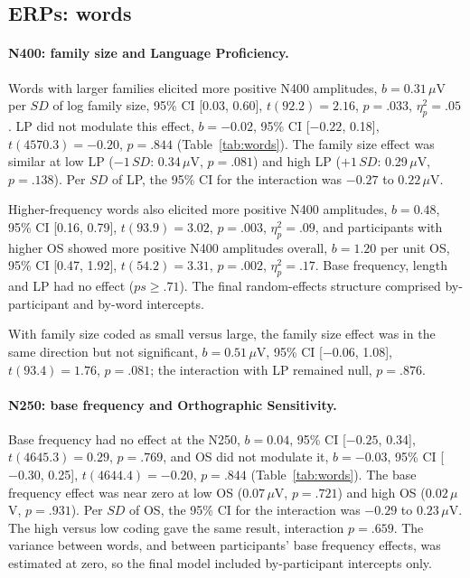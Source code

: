 \subsection{ERPs: words}

\paragraph{N400: family size and Language Proficiency.}
Words with larger families elicited more positive N400 amplitudes, $b = 0.31$\,$\mu$V
per $SD$ of log family size, 95\% CI [0.03, 0.60], $t(92.2) = 2.16$, $p = .033$,
$\eta^2_p = .05$. LP did not modulate this effect, $b = -0.02$, 95\% CI
[$-0.22$, 0.18], $t(4570.3) = -0.20$, $p = .844$ (Table~\ref{tab:words}). The
family size effect was similar at low LP ($-1\,SD$: 0.34\,$\mu$V, $p = .081$)
and high LP ($+1\,SD$: 0.29\,$\mu$V, $p = .138$). Per $SD$ of LP, the 95\% CI
for the interaction was $-0.27$ to $0.22$\,$\mu$V.

Higher-frequency words also elicited more positive N400 amplitudes, $b = 0.48$,
95\% CI [0.16, 0.79], $t(93.9) = 3.02$, $p = .003$, $\eta^2_p = .09$, and
participants with higher OS showed more positive N400 amplitudes overall,
$b = 1.20$ per unit OS, 95\% CI [0.47, 1.92], $t(54.2) = 3.31$, $p = .002$,
$\eta^2_p = .17$. Base frequency, length and LP had no effect ($ps \geq .71$).
The final random-effects structure comprised by-participant and by-word
intercepts.

With family size coded as small versus large, the family size effect was in the
same direction but not significant, $b = 0.51$\,$\mu$V, 95\% CI [$-0.06$, 1.08],
$t(93.4) = 1.76$, $p = .081$; the interaction with LP remained null, $p = .876$.

\paragraph{N250: base frequency and Orthographic Sensitivity.}
Base frequency had no effect at the N250, $b = 0.04$, 95\% CI [$-0.25$, 0.34],
$t(4645.3) = 0.29$, $p = .769$, and OS did not modulate it, $b = -0.03$, 95\% CI
[$-0.30$, 0.25], $t(4644.4) = -0.20$, $p = .844$ (Table~\ref{tab:words}). The
base frequency effect was near zero at low OS ($0.07$\,$\mu$V, $p = .721$) and
high OS ($0.02$\,$\mu$V, $p = .931$). Per $SD$ of OS, the 95\% CI for the
interaction was $-0.29$ to $0.23$\,$\mu$V. The high versus low coding gave the
same result, interaction $p = .659$. The variance between words, and between
participants' base frequency effects, was estimated at zero, so the final model
included by-participant intercepts only.

